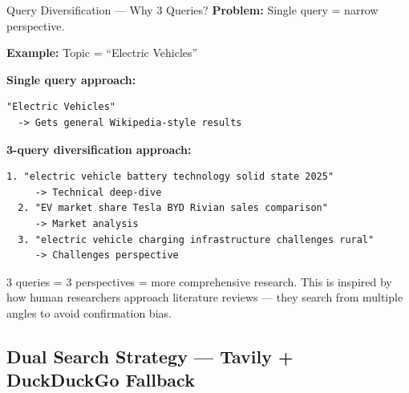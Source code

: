 \documentclass[11pt,a4paper,twoside]{report}
\begin{document}
\begin{conceptbox}{Query Diversification --- Why 3 Queries?}
\textbf{Problem:} Single query = narrow perspective.

\textbf{Example:} Topic = ``Electric Vehicles''

\textbf{Single query approach:}
\begin{lstlisting}[language={}]
  "Electric Vehicles"
  -> Gets general Wikipedia-style results
\end{lstlisting}

\textbf{3-query diversification approach:}
\begin{lstlisting}[language={}]
  1. "electric vehicle battery technology solid state 2025"
     -> Technical deep-dive
  2. "EV market share Tesla BYD Rivian sales comparison"
     -> Market analysis
  3. "electric vehicle charging infrastructure challenges rural"
     -> Challenges perspective
\end{lstlisting}

3 queries = 3 perspectives = more comprehensive research. This is inspired by how human researchers approach literature reviews --- they search from multiple angles to avoid confirmation bias.
\end{conceptbox}

\subsection{Dual Search Strategy --- Tavily + DuckDuckGo Fallback}
\end{document}
